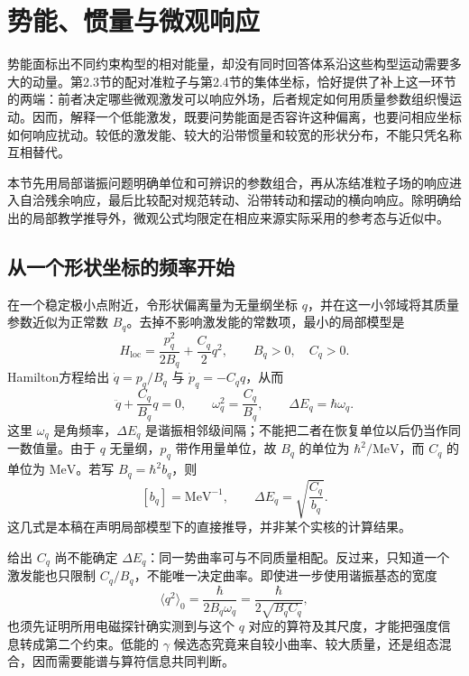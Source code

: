 \section{势能、惯量与微观响应}\label{sec:2-6}

势能面标出不同约束构型的相对能量，却没有同时回答体系沿这些构型运动需要多大的动量。第2.3节的配对准粒子与第2.4节的集体坐标，恰好提供了补上这一环节的两端：前者决定哪些微观激发可以响应外场，后者规定如何用质量参数组织慢运动。因而，解释一个低能激发，既要问势能面是否容许这种偏离，也要问相应坐标如何响应扰动。较低的激发能、较大的沿带惯量和较宽的形状分布，不能只凭名称互相替代。

本节先用局部谐振问题明确单位和可辨识的参数组合，再从冻结准粒子场的响应进入自洽残余响应，最后比较配对规范转动、沿带转动和摆动的横向响应。除明确给出的局部教学推导外，微观公式均限定在相应来源实际采用的参考态与近似中。\cite{prochniak-rohozinski-2009-bohr-collective-hamiltonian,hinohara-2015-nambu-goldstone-inertia-response,matsuzaki-2004-nuclear-inertia-and-wobbling}

\subsection{从一个形状坐标的频率开始}\label{sec:2-6-1}

在一个稳定极小点附近，令形状偏离量为无量纲坐标 \(q\)，并在这一小邻域将其质量参数近似为正常数 \(B_q\)。去掉不影响激发能的常数项，最小的局部模型是
\begin{equation}\label{eq:2-6-local-hamiltonian}
H_{\mathrm{loc}}=\frac{p_q^2}{2B_q}+\frac{C_q}{2}q^2,
\qquad B_q>0,\quad C_q>0 .
\end{equation}
Hamilton方程给出 \(\dot q=p_q/B_q\) 与 \(\dot p_q=-C_q q\)，从而
\begin{equation}\label{eq:2-6-local-frequency}
\ddot q+\frac{C_q}{B_q}q=0,\qquad
\omega_q^2=\frac{C_q}{B_q},\qquad
\Delta E_q=\hbar\omega_q .
\end{equation}
这里 \(\omega_q\) 是角频率，\(\Delta E_q\) 是谐振相邻级间隔；不能把二者在恢复单位以后仍当作同一数值量。由于 \(q\) 无量纲，\(p_q\) 带作用量单位，故 \(B_q\) 的单位为 \(\hbar^2/\mathrm{MeV}\)，而 \(C_q\) 的单位为 \(\mathrm{MeV}\)。若写 \(B_q=\hbar^2 b_q\)，则
\begin{equation}\label{eq:2-6-local-energy-units}
[b_q]=\mathrm{MeV}^{-1},\qquad
\Delta E_q=\sqrt{\frac{C_q}{b_q}} .
\end{equation}
这几式是本稿在声明局部模型下的直接推导，并非某个实核的计算结果。

给出 \(C_q\) 尚不能确定 \(\Delta E_q\)：同一势曲率可与不同质量相配。反过来，只知道一个激发能也只限制 \(C_q/B_q\)，不能唯一决定曲率。即使进一步使用谐振基态的宽度
\begin{equation}\label{eq:2-6-local-width}
\langle q^2\rangle_0=\frac{\hbar}{2B_q\omega_q}
=\frac{\hbar}{2\sqrt{B_qC_q}},
\end{equation}
也须先证明所用电磁探针确实测到与这个 \(q\) 对应的算符及其尺度，才能把强度信息转成第二个约束。低能的 \(\gamma\) 候选态究竟来自较小曲率、较大质量，还是组态混合，因而需要能谱与算符信息共同判断。

